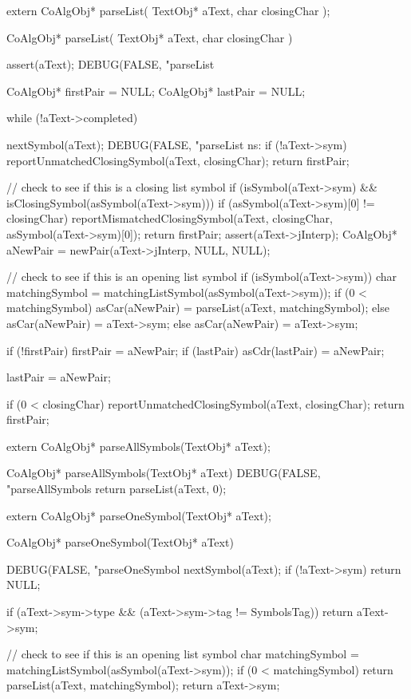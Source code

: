 \startCHeader
extern CoAlgObj* parseList(
  TextObj* aText,
  char closingChar
);
\stopCHeader

\startCCode
CoAlgObj* parseList(
  TextObj* aText,
  char closingChar
) {
  assert(aText);
  DEBUG(FALSE, "parseList %

  CoAlgObj* firstPair = NULL;
  CoAlgObj* lastPair  = NULL;

  while (!aText->completed) {

    nextSymbol(aText);
    DEBUG(FALSE, "parseList ns: %
    if (!aText->sym) {
      reportUnmatchedClosingSymbol(aText, closingChar);
      return firstPair;
    }

    // check to see if this is a closing list symbol
    if (isSymbol(aText->sym) &&
        isClosingSymbol(asSymbol(aText->sym))) {
      if (asSymbol(aText->sym)[0] != closingChar) {
        reportMismatchedClosingSymbol(aText, closingChar,
                                      asSymbol(aText->sym)[0]);
      }
      return firstPair;
    }
    assert(aText->jInterp);
    CoAlgObj* aNewPair = newPair(aText->jInterp, NULL, NULL);

    // check to see if this is an opening list symbol
    if (isSymbol(aText->sym)) {
      char matchingSymbol = matchingListSymbol(asSymbol(aText->sym));
      if (0 < matchingSymbol) {
        asCar(aNewPair) = parseList(aText, matchingSymbol);
      } else asCar(aNewPair) = aText->sym;
    } else asCar(aNewPair) = aText->sym;

    if (!firstPair) firstPair       = aNewPair;
    if (lastPair)   asCdr(lastPair) = aNewPair;

    lastPair = aNewPair;
  }

  if (0 < closingChar) reportUnmatchedClosingSymbol(aText, closingChar);
  return firstPair;
}
\stopCCode

\startCHeader
extern CoAlgObj* parseAllSymbols(TextObj* aText);
\stopCHeader

\startCCode
CoAlgObj* parseAllSymbols(TextObj* aText) {
  DEBUG(FALSE, "parseAllSymbols %
  return parseList(aText, 0);
}
\stopCCode


\startCHeader
extern CoAlgObj* parseOneSymbol(TextObj* aText);
\stopCHeader

\startCCode
CoAlgObj* parseOneSymbol(TextObj* aText) {
  DEBUG(FALSE, "parseOneSymbol %
  nextSymbol(aText);
  if (!aText->sym) return NULL;

  if (aText->sym->type &&
     (aText->sym->tag != SymbolsTag)) return aText->sym;

  // check to see if this is an opening list symbol
  char matchingSymbol = matchingListSymbol(asSymbol(aText->sym));
  if (0 < matchingSymbol) {
    return parseList(aText, matchingSymbol);
  }
  return aText->sym;
}
\stopCCode

